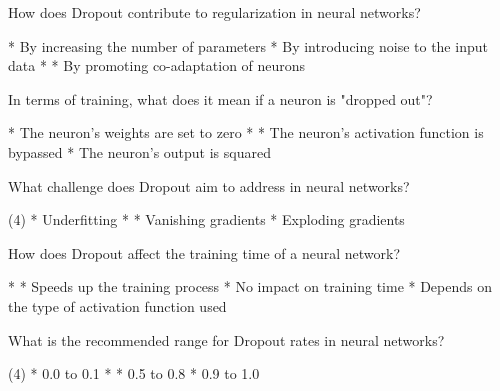 \documentclass[11pt]{extarticle}
\begin{document}
\begin{exercise}
    How does Dropout contribute to regularization in neural networks?
    \begin{choice}
        * By increasing the number of parameters
        * By introducing noise to the input data
        * 
        * By promoting co-adaptation of neurons
    \end{choice}
\end{exercise}
\begin{solution}
\end{solution}

\begin{exercise}
    In terms of training, what does it mean if a neuron is "dropped out"?
    \begin{choice}
        * The neuron's weights are set to zero
        * 
        * The neuron's activation function is bypassed
        * The neuron's output is squared
    \end{choice}
\end{exercise}
\begin{solution}
\end{solution}

\begin{exercise}
    What challenge does Dropout aim to address in neural networks?
    \begin{choice} (4)
        * Underfitting
        * 
        * Vanishing gradients
        * Exploding gradients
    \end{choice}
\end{exercise}
\begin{solution}
\end{solution}

\begin{exercise}
    How does Dropout affect the training time of a neural network?
    \begin{choice}
        * 
        * Speeds up the training process
        * No impact on training time
        * Depends on the type of activation function used
    \end{choice}
\end{exercise}
\begin{solution}
\end{solution}

\begin{exercise}
    What is the recommended range for Dropout rates in neural networks?
    \begin{choice} (4)
        * 0.0 to 0.1
        * 
        * 0.5 to 0.8
        * 0.9 to 1.0
    \end{choice}
\end{exercise}
\begin{solution}
\end{solution}
\end{document}
